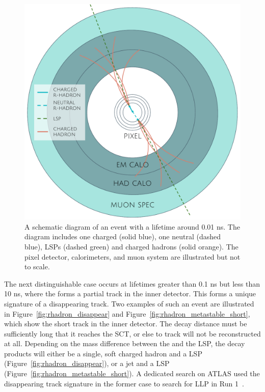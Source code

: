 \begin{figure}[tb]
\centering
\includegraphics[width=\fullfig]{figures/rhadron_displaced.pdf}
\caption{A schematic diagram of an \rhadron event with a lifetime around 0.01 ns. The diagram includes one charged \rhadron (solid blue), one neutral \rhadron (dashed blue), \acsp*{LSP} (dashed green) and charged hadrons (solid orange). The pixel detector, calorimeters, and muon system are illustrated but not to scale.}
\label{fig:rhadron_displaced}
\end{figure}

The next distinguishable case occurs at lifetimes greater than 0.1 ns but less than 10 ns, where the \rhadron forms a partial track in the inner detector.
This forms a unique signature of a disappearing track.
Two examples of such an event are illustrated in Figure~\ref{fig:rhadron_disappear} and Figure~\ref{fig:rhadron_metastable_short}, which show the short track in the inner detector.
The decay distance must be sufficiently long that it reaches the \ac{SCT}, or else to track will not be reconstructed at all.
Depending on the mass difference between the \rhadron and the \ac{LSP}, the decay products will either be a single, soft charged hadron and a \ac{LSP} (Figure~\ref{fig:rhadron_disappear}), or a jet and a \ac{LSP} (Figure~\ref{fig:rhadron_metastable_short}).
A dedicated search on ATLAS used the disappearing track signature  in the former case to search for \ac{LLP} in Run 1~\cite{SUSY-2013-01}.

